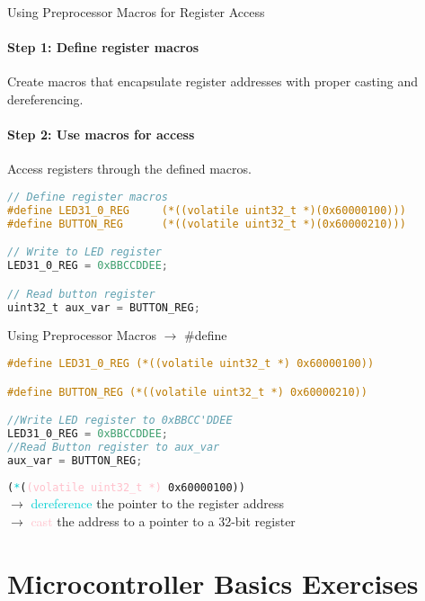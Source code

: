 \begin{KR}{Using Preprocessor Macros for Register Access}
\paragraph{Step 1: Define register macros}
Create macros that encapsulate register addresses with proper casting and dereferencing.
\paragraph{Step 2: Use macros for access}
Access registers through the defined macros.

\begin{lstlisting}[language=C, style=basesmol]
// Define register macros
#define LED31_0_REG     (*((volatile uint32_t *)(0x60000100)))
#define BUTTON_REG      (*((volatile uint32_t *)(0x60000210)))

// Write to LED register
LED31_0_REG = 0xBBCCDDEE;

// Read button register
uint32_t aux_var = BUTTON_REG;
\end{lstlisting}
\end{KR}

\begin{examplecode}{Using Preprocessor Macros} $\rightarrow$ \#define
\begin{lstlisting}[language=C, style=basesmol]
#define LED31_0_REG (*((volatile uint32_t *) 0x60000100))

#define BUTTON_REG (*((volatile uint32_t *) 0x60000210))

//Write LED register to 0xBBCC'DDEE
LED31_0_REG = 0xBBCCDDEE;
//Read Button register to aux_var
aux_var = BUTTON_REG;
\end{lstlisting}
    \vspace{2mm}
    \texttt{(\textcolor{darkturquoise}{*}(\textcolor{pink}{(volatile\ uint32\_t *)} 0x60000100))}\\
    $\rightarrow$ \textcolor{darkturquoise}{dereference} the pointer to the register address\\
    $\rightarrow$ \textcolor{pink}{cast} the address to a pointer to a 32-bit register
\end{examplecode}

\raggedcolumns
\columnbreak

\section{Microcontroller Basics Exercises}

